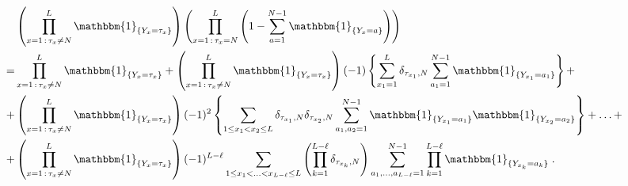 \documentclass[10pt]{article}
\numberwithin{equation}{section}
\numberwithin{equation}{subsection}
\newcommand{\dt}{\;.}
\begin{document}
\begin{align}\label{sum}
&\left(\prod_{x=1\,:\,\tau_{x}\neq N}^{L}\mathbbm{1}_{\{Y_x=\tau_{x}\}}\right)\left(\prod_{x=1\,:\,\tau_{x}=N}^{L}\left(1-\sum_{a=1}^{N-1}\mathbbm{1}_{\{Y_x=a\}}\right)\right)\nonumber\\
=&
\prod_{x=1\,:\,\tau_{x}\neq N}^{L}\mathbbm{1}_{\{Y_x=\tau_{x}\}}+\left(\prod_{x=1\,:\,\tau_{x}\neq N}^{L}\mathbbm{1}_{\{Y_x=\tau_{x}\}}\right)(-1)\left\{\sum_{x_{1}=1}^{L}\delta_{\tau_{x_{1}},N}\sum_{a_{1}=1}^{N-1}\mathbbm{1}_{\{Y_{x_{1}}
=
a_{1}\}}\right\}+\nonumber\\
+&\left(\prod_{x=1\,:\,\tau_{x}\neq N}^{L}\mathbbm{1}_{\{Y_x=\tau_{x}\}}\right)(-1)^{2}\left\{\sum_{1\leq x_{1}<x_{2}\leq L}\delta_{\tau_{x_{1}},N}\delta_{\tau_{x_{2}},N}\sum_{a_{1},a_{2}=1}^{N-1}\mathbbm{1}_{\{Y_{x_{1}}=a_{1}\}}\mathbbm{1}_{\{Y_{x_{2}}=a_{2}\}}\right\}+\ldots+
\nonumber\\
+&\left(\prod_{x=1\,:\,\tau_{x}\neq N}^{L}\mathbbm{1}_{\{Y_x=\tau_{x}\}}\right)(-1)^{L-\ell}\sum_{1\leq x_{1}<\ldots<x_{L-\ell}\leq L}\left(\prod_{k=1}^{L-\ell}\delta_{\tau_{x_{k}},N}\right)\sum_{a_{1},\ldots,a_{L-\ell}=1}^{N-1}\prod_{k=1}^{L-\ell}\mathbbm{1}_{\{Y_{x_{k}}=a_{k}\}}\dt
\end{align} 
\end{document}
